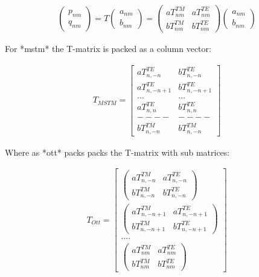 \begin{align}
	\begin{pmatrix}
		p_{nm}\\
		q_{nm}
	\end{pmatrix} =T 
	\begin{pmatrix}
		a_{nm}\\
		b_{nm}
	\end{pmatrix} = 
	\begin{pmatrix}
		aT^{TM}_{nm} & aT^{TE}_{nm}\\ 
		bT^{TM}_{nm} & bT^{TE}_{nm}
	\end{pmatrix}
	\begin{pmatrix}
		a_{nm}\\
		b_{nm}
	\end{pmatrix}
\end{align} 

For *mstm* the T-matrix is packed as a column vector:

\begin{align}
	T_{MSTM} = 
	\begin{bmatrix} 
		aT^{TE}_{n,-n} & bT^{TE}_{n,-n} \\ 
		aT^{TE}_{n, -n+1} & bT^{TE}_{n, -n+1} \\ 
		... & ...\\ 
		aT^{TE}_{n,n} & bT^{TE}_{n,n} \\ 
		----&----\\ 
		bT^{TM}_{n,-n} &bT^{TM}_{n,-n} 
	\end{bmatrix}
\end{align}

Where as *ott* packs packs the T-matrix with sub matrices:

\begin{align}
	T_{Ott} = 
	\begin{bmatrix} 
		\begin{pmatrix}
			aT^{TM}_{n,-n} & aT^{TE}_{n,-n}\\ 
			bT^{TM}_{n,-n}&bT^{TE}_{n,-n}
		\end{pmatrix} \\ 
		\begin{pmatrix}
			aT^{TM}_{n,-n+1} & aT^{TE}_{n,-n+1}\\ 
			bT^{TM}_{n,-n+1} & bT^{TE}_{n,-n+1}
		\end{pmatrix}\\
		....\\ 
		\begin{pmatrix}
			aT^{TM}_{nm} & aT^{TE}_{nm}\\ 
			bT^{TM}_{nm} & bT^{TE}_{nm}
		\end{pmatrix}
	\end{bmatrix}
\end{align}

